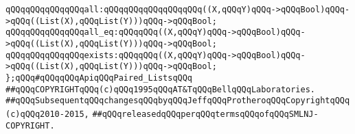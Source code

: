 \verb|qQQqqQQqqQQqqQQqall:qQQqqQQqqQQqqQQqqQQq((X,qQQqY)qQQq->qQQqBool)qQQq->qQQq((List(X),qQQqList(Y)))qQQq->qQQqBool;|\newline
\verb|qQQqqQQqqQQqqQQqall_eq:qQQqqQQq((X,qQQqY)qQQq->qQQqBool)qQQq->qQQq((List(X),qQQqList(Y)))qQQq->qQQqBool;|\newline
\newline
\verb|qQQqqQQqqQQqqQQqexists:qQQqqQQq((X,qQQqY)qQQq->qQQqBool)qQQq->qQQq((List(X),qQQqList(Y)))qQQq->qQQqBool;|\newline
\newline
\verb|};qQQq#qQQqqQQqApiqQQqPaired_ListsqQQq|\newline
\newline
\newline
\verb|##qQQqCOPYRIGHTqQQq(c)qQQq1995qQQqAT&TqQQqBellqQQqLaboratories.|\newline
\verb|##qQQqSubsequentqQQqchangesqQQqbyqQQqJeffqQQqProtheroqQQqCopyrightqQQq(c)qQQq2010-2015,|\newline
\verb|##qQQqreleasedqQQqperqQQqtermsqQQqofqQQqSMLNJ-COPYRIGHT.|\newline

